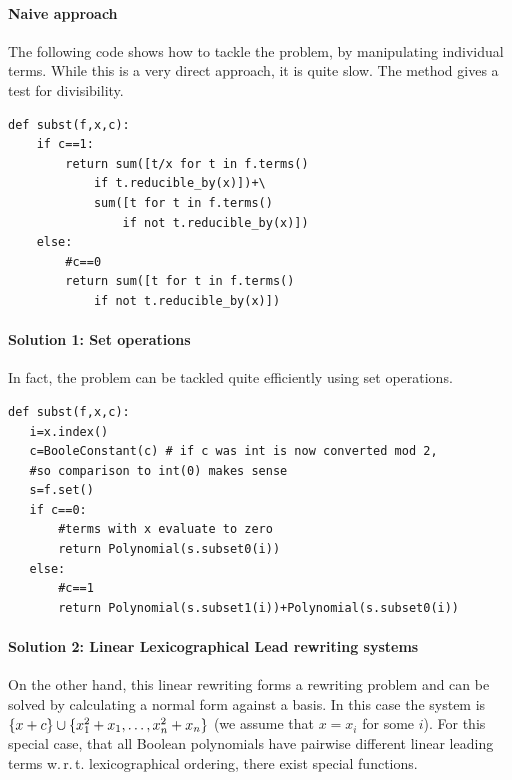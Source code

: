 \paragraph{Naive approach}
The following code shows how to tackle the problem, by manipulating individual terms.
While this is a very direct approach, it is quite slow.
The method  gives a test for divisibility.
\begin{lstlisting}
def subst(f,x,c):
    if c==1:
        return sum([t/x for t in f.terms() 
            if t.reducible_by(x)])+\
            sum([t for t in f.terms() 
                if not t.reducible_by(x)])
    else:
        #c==0
        return sum([t for t in f.terms() 
            if not t.reducible_by(x)])

\end{lstlisting}

\paragraph{Solution 1: Set operations}
In fact, the problem can be tackled quite efficiently using set operations.
\begin{lstlisting}
def subst(f,x,c):
   i=x.index()
   c=BooleConstant(c) # if c was int is now converted mod 2, 
   #so comparison to int(0) makes sense
   s=f.set()
   if c==0:
       #terms with x evaluate to zero
       return Polynomial(s.subset0(i))
   else:
       #c==1
       return Polynomial(s.subset1(i))+Polynomial(s.subset0(i))    
\end{lstlisting}

\paragraph{Solution 2: Linear Lexicographical Lead rewriting systems}
On the other hand, this linear rewriting forms a rewriting problem and can be solved by calculating a normal form against a \Groebner 
basis.
In this case the system is $\{x+c\} \cup \{{x_1^2+x_1,\ldots,x_n^2+x_n}\}$ (we assume that $x=x_i$ for some $i$).
For this special case, that all Boolean polynomials have pairwise different linear leading terms w.\,r.\,t. lexicographical ordering,
there exist special functions.

